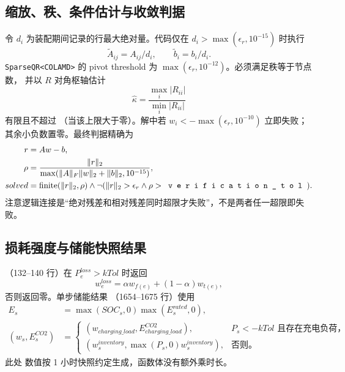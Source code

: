 \subsection{缩放、秩、条件估计与收敛判据}
令 $d_i$ 为装配期间记录的行最大绝对量。代码仅在 $d_i>\max(\epsilon_r,10^{-15})$ 时执行
\begin{equation}
\widetilde A_{ij}=A_{ij}/d_i,\qquad \widetilde b_i=b_i/d_i.
\end{equation}
\texttt{SparseQR<COLAMD>} 的 pivot threshold 为 $\max(\epsilon_r,10^{-12})$。必须满足秩等于节点数，
并以 $R$ 对角枢轴估计
\begin{equation}
\widehat\kappa=\frac{\max_i|R_{ii}|}{\min_i|R_{ii}|}
\end{equation}
有限且不超过 （当该上限大于零）。解中若
$w_i<-\max(\epsilon_r,10^{-10})$ 立即失败；其余小负数置零。最终判据精确为
\begin{align}
r&=Aw-b,\\
\rho&=\frac{\|r\|_2}{\max(\|A\|_F\|w\|_2+\|b\|_2,10^{-15})},\\
solved&=\operatorname{finite}(\|r\|_2,\rho)\land
\neg(\|r\|_2>\epsilon_r\land\rho>\fld{verification\_tol}).
\end{align}
注意逻辑连接是“绝对残差和相对残差同时超限才失败”，不是两者任一超限即失败。

\subsection{损耗强度与储能快照结果}
（132--140 行）在 $P_e^{loss}>kTol$ 时返回
\begin{equation}
w_e^{loss}=\alpha w_{f(e)}+(1-\alpha)w_{t(e)},
\end{equation}
否则返回零。单步储能结果 （1654--1675 行）使用
\begin{align}
E_s&=\max(SOC_s,0)\max(E_s^{rated},0),\\
(w_s,E_s^{CO2})&=\begin{cases}
(w_{charging\_load},E_{charging\_load}^{CO2}),&P_s<-kTol\text{ 且存在充电负荷，}\\
(w_s^{inventory},\max(P_s,0)w_s^{inventory}),&\text{否则。}
\end{cases}
\end{align}
此处  数值按 1 小时快照约定生成，函数体没有额外乘时长。


